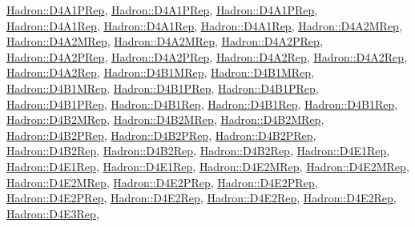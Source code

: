 \mbox{\hyperlink{structHadron_1_1D4A1PRep}{Hadron\+::\+D4\+A1\+P\+Rep}}, \mbox{\hyperlink{structHadron_1_1D4A1PRep}{Hadron\+::\+D4\+A1\+P\+Rep}}, \mbox{\hyperlink{structHadron_1_1D4A1PRep}{Hadron\+::\+D4\+A1\+P\+Rep}}, \mbox{\hyperlink{structHadron_1_1D4A1Rep}{Hadron\+::\+D4\+A1\+Rep}}, \mbox{\hyperlink{structHadron_1_1D4A1Rep}{Hadron\+::\+D4\+A1\+Rep}}, \mbox{\hyperlink{structHadron_1_1D4A1Rep}{Hadron\+::\+D4\+A1\+Rep}}, \mbox{\hyperlink{structHadron_1_1D4A2MRep}{Hadron\+::\+D4\+A2\+M\+Rep}}, \mbox{\hyperlink{structHadron_1_1D4A2MRep}{Hadron\+::\+D4\+A2\+M\+Rep}}, \mbox{\hyperlink{structHadron_1_1D4A2MRep}{Hadron\+::\+D4\+A2\+M\+Rep}}, \mbox{\hyperlink{structHadron_1_1D4A2PRep}{Hadron\+::\+D4\+A2\+P\+Rep}}, \mbox{\hyperlink{structHadron_1_1D4A2PRep}{Hadron\+::\+D4\+A2\+P\+Rep}}, \mbox{\hyperlink{structHadron_1_1D4A2PRep}{Hadron\+::\+D4\+A2\+P\+Rep}}, \mbox{\hyperlink{structHadron_1_1D4A2Rep}{Hadron\+::\+D4\+A2\+Rep}}, \mbox{\hyperlink{structHadron_1_1D4A2Rep}{Hadron\+::\+D4\+A2\+Rep}}, \mbox{\hyperlink{structHadron_1_1D4A2Rep}{Hadron\+::\+D4\+A2\+Rep}}, \mbox{\hyperlink{structHadron_1_1D4B1MRep}{Hadron\+::\+D4\+B1\+M\+Rep}}, \mbox{\hyperlink{structHadron_1_1D4B1MRep}{Hadron\+::\+D4\+B1\+M\+Rep}}, \mbox{\hyperlink{structHadron_1_1D4B1MRep}{Hadron\+::\+D4\+B1\+M\+Rep}}, \mbox{\hyperlink{structHadron_1_1D4B1PRep}{Hadron\+::\+D4\+B1\+P\+Rep}}, \mbox{\hyperlink{structHadron_1_1D4B1PRep}{Hadron\+::\+D4\+B1\+P\+Rep}}, \mbox{\hyperlink{structHadron_1_1D4B1PRep}{Hadron\+::\+D4\+B1\+P\+Rep}}, \mbox{\hyperlink{structHadron_1_1D4B1Rep}{Hadron\+::\+D4\+B1\+Rep}}, \mbox{\hyperlink{structHadron_1_1D4B1Rep}{Hadron\+::\+D4\+B1\+Rep}}, \mbox{\hyperlink{structHadron_1_1D4B1Rep}{Hadron\+::\+D4\+B1\+Rep}}, \mbox{\hyperlink{structHadron_1_1D4B2MRep}{Hadron\+::\+D4\+B2\+M\+Rep}}, \mbox{\hyperlink{structHadron_1_1D4B2MRep}{Hadron\+::\+D4\+B2\+M\+Rep}}, \mbox{\hyperlink{structHadron_1_1D4B2MRep}{Hadron\+::\+D4\+B2\+M\+Rep}}, \mbox{\hyperlink{structHadron_1_1D4B2PRep}{Hadron\+::\+D4\+B2\+P\+Rep}}, \mbox{\hyperlink{structHadron_1_1D4B2PRep}{Hadron\+::\+D4\+B2\+P\+Rep}}, \mbox{\hyperlink{structHadron_1_1D4B2PRep}{Hadron\+::\+D4\+B2\+P\+Rep}}, \mbox{\hyperlink{structHadron_1_1D4B2Rep}{Hadron\+::\+D4\+B2\+Rep}}, \mbox{\hyperlink{structHadron_1_1D4B2Rep}{Hadron\+::\+D4\+B2\+Rep}}, \mbox{\hyperlink{structHadron_1_1D4B2Rep}{Hadron\+::\+D4\+B2\+Rep}}, \mbox{\hyperlink{structHadron_1_1D4E1Rep}{Hadron\+::\+D4\+E1\+Rep}}, \mbox{\hyperlink{structHadron_1_1D4E1Rep}{Hadron\+::\+D4\+E1\+Rep}}, \mbox{\hyperlink{structHadron_1_1D4E1Rep}{Hadron\+::\+D4\+E1\+Rep}}, \mbox{\hyperlink{structHadron_1_1D4E2MRep}{Hadron\+::\+D4\+E2\+M\+Rep}}, \mbox{\hyperlink{structHadron_1_1D4E2MRep}{Hadron\+::\+D4\+E2\+M\+Rep}}, \mbox{\hyperlink{structHadron_1_1D4E2MRep}{Hadron\+::\+D4\+E2\+M\+Rep}}, \mbox{\hyperlink{structHadron_1_1D4E2PRep}{Hadron\+::\+D4\+E2\+P\+Rep}}, \mbox{\hyperlink{structHadron_1_1D4E2PRep}{Hadron\+::\+D4\+E2\+P\+Rep}}, \mbox{\hyperlink{structHadron_1_1D4E2PRep}{Hadron\+::\+D4\+E2\+P\+Rep}}, \mbox{\hyperlink{structHadron_1_1D4E2Rep}{Hadron\+::\+D4\+E2\+Rep}}, \mbox{\hyperlink{structHadron_1_1D4E2Rep}{Hadron\+::\+D4\+E2\+Rep}}, \mbox{\hyperlink{structHadron_1_1D4E2Rep}{Hadron\+::\+D4\+E2\+Rep}}, \mbox{\hyperlink{structHadron_1_1D4E3Rep}{Hadron\+::\+D4\+E3\+Rep}}, 